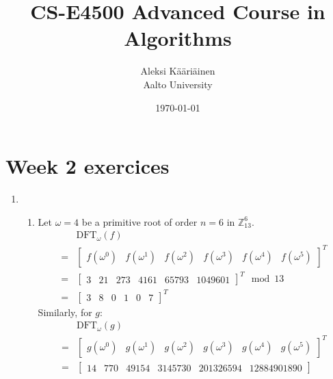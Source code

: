 \documentclass[11pt,a4paper]{article}
\title{CS-E4500 Advanced Course in Algorithms}
\author{Aleksi Kääriäinen  \\
	Aalto University  \\
	}
\begin{document}
\date{\today}

\maketitle

\newpage

\section*{Week 2 exercices}

\begin{enumerate}
    \item \begin{enumerate}
              \item Let $\omega = 4$ be a primitive root of order $n = 6$ in $\mathbb{Z}_{13}^6$.
                    \begin{align*}
                          & \text{DFT}_\omega(f)                  \\ = & \begin{bmatrix}
                            f(\omega^0) & f(\omega^1) & f(\omega^2) & f(\omega^3) & f(\omega^4) & f(\omega^5)
                        \end{bmatrix}^T \\
                        = & \begin{bmatrix}
                                3 & 21 & 273 & 4161 & 65793 & 1049601
                            \end{bmatrix}^T \mod{13} \\
                        = & \begin{bmatrix}
                                3 & 8 & 0 & 1 & 0 & 7
                            \end{bmatrix}^T
                    \end{align*}
                    Similarly, for $g$:
                    \begin{align*}
                          & \text{DFT}_\omega(g)                                 \\ = & \begin{bmatrix}
                            g(\omega^0) & g(\omega^1) & g(\omega^2) & g(\omega^3) & g(\omega^4) & g(\omega^5)
                        \end{bmatrix}^T \\
                        = & \begin{bmatrix}
                                14 & 770 & 49154 & 3145730 & 201326594 & 12884901890

\end{bmatrix}
\end{align*}
\end{enumerate}
\end{enumerate}
\end{document}
